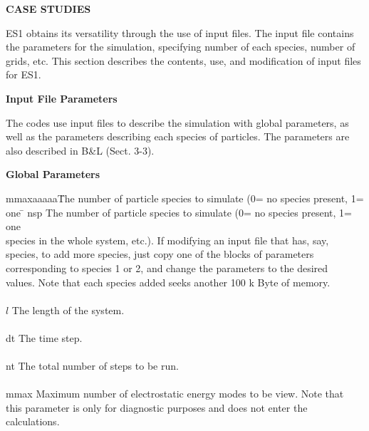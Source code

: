 \newpage
\begin{section}
{\bf CASE STUDIES}

ES1 obtains its versatility through the use of input files.  The input file
contains the parameters for the simulation, specifying number of each species,
number of grids, etc.  This section describes the contents, use, and
modification of input files for ES1.

\begin{subsection}
{\bf Input File Parameters}

   The codes use input files to describe the simulation with global parameters,
   as well as the parameters describing each species of particles.  The
   parameters are also described in B\&L (Sect. 3-3).

\begin{subsubsection}
{\bf Global Parameters}
\begin{tabbing}
      mmaxaaaaa\=  The number of particle species to simulate (0= no species present, 1= one \= \kill
      nsp       \>  The number of particle species to simulate (0= no species present, 1= one \> \\
		\>	species in the whole system, etc.).  If
			modifying an input file that has, say, \> \\
		 species, to add more species,
			just copy one of the blocks of parameters  \> \\
		\>	corresponding to species 1
			or 2, and change the parameters to the desired\> \\
		\>	values.  Note that each species added seeks another 100 k Byte of memory. \> \\
										\\
      $l$         \>    The length of the system. \> \\
							\\
      dt         \>   The time step. \> \\
						\\
      nt        \>     The total number of steps to be run. \\
								\\
      mmax    \>      Maximum number of electrostatic energy modes to be view.
                    Note that \> \\
	      \> this parameter is only for diagnostic purposes
                    and does not enter the \> \\
	       \> calculations. \> \\
								\\

\end{tabbing}
\end{subsubsection}
\end{subsection}
\end{section}

